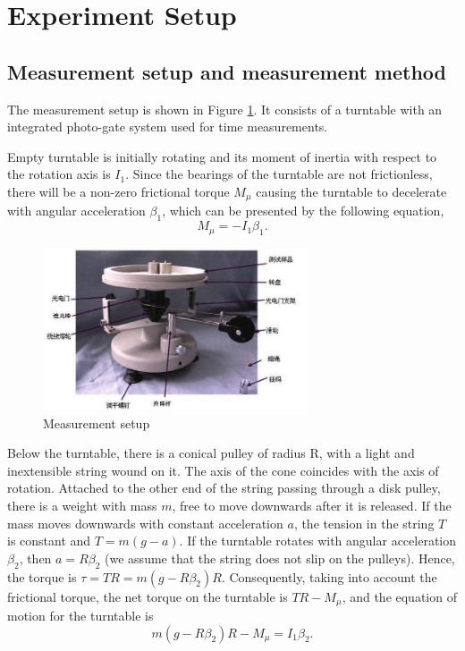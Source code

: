 \section{Experiment Setup}
\subsection{Measurement setup and measurement method}
    The measurement setup is shown in Figure \ref{app1}. It consists of a turntable with an integrated photo-gate system used for time measurements.

    Empty turntable is initially rotating and its moment of inertia with respect to the rotation axis is $I_1$. Since the bearings of the turntable are not frictionless, there will be a non-zero frictional torque $M_{\mu}$ causing the turntable to decelerate with angular acceleration $\beta_1$, which can be presented by the following equation,
    \begin{equation}\label{equ_fric}
        M_{\mu}=-I_1\beta_1.
    \end{equation}

    \begin{figure}[H]
    \centering
        \includegraphics[width=0.7\textwidth]{images/app1}
        \caption{Measurement setup}\label{app1}
    \end{figure}

    Below the turntable, there is a conical pulley of radius R, with a light and inextensible string wound on it. The axis of the cone coincides with the axis of rotation. Attached to the other end of the string passing through a disk pulley, there is a weight with mass $m$, free to move downwards after it is released. If the mass moves downwards with constant acceleration $a$, the tension in the string $T$ is constant and $T=m(g-a)$. If the turntable rotates with angular acceleration $\beta_2$, then $a=R\beta_2$ (we assume that the string does not slip on the pulleys). Hence, the torque is $\tau=TR=m(g-R\beta_2)R$. Consequently, taking into account the frictional torque, the net torque on the turntable is $TR-M_{\mu}$, and the equation of motion for the turntable is
    \begin{equation}\label{equ_motion}
        m(g-R\beta_2)R-M_{\mu}=I_1\beta_2.
    \end{equation}

